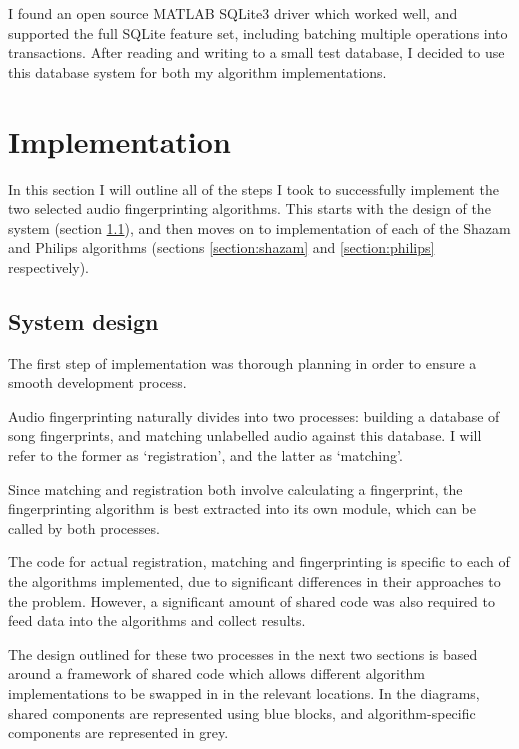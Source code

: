 \documentclass[12pt,a4paper,twoside,openright]{report}
\begin{document}
I found an open source MATLAB SQLite3 driver \cite{Yamaguchi14} which worked well, and supported the full SQLite feature set, including batching multiple operations into transactions. After reading and writing to a small test database, I decided to use this database system for both my algorithm implementations.





\chapter{Implementation}

In this section I will outline all of the steps I took to successfully implement the two selected audio fingerprinting algorithms. This starts with the design of the system (section \ref{section:systemdesign}), and then moves on to implementation of each of the Shazam and Philips algorithms (sections \ref{section:shazam} and \ref{section:philips} respectively).


\section{System design}
\label{section:systemdesign}

The first step of implementation was thorough planning in order to ensure a smooth development process. 

Audio fingerprinting naturally divides into two processes: building a database of song fingerprints, and matching unlabelled audio against this database. I will refer to the former as `registration', and the latter as `matching'.

Since matching and registration both involve calculating a fingerprint, the fingerprinting algorithm is best extracted into its own module, which can be called by both processes.

The code for actual registration, matching and fingerprinting is specific to each of the algorithms implemented, due to significant differences in their approaches to the problem. However, a significant amount of shared code was also required to feed data into the algorithms and collect results.

The design outlined for these two processes in the next two sections is based around a framework of shared code which allows different algorithm implementations to be swapped in in the relevant locations. In the diagrams, shared components are represented using blue blocks, and algorithm-specific components are represented in grey. 
\end{document}
